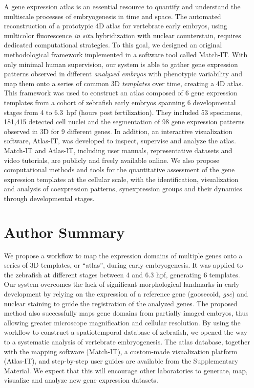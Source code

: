 A gene expression atlas is an essential resource to quantify and understand the multiscale processes of embryogenesis in time and space. The automated reconstruction of a prototypic 4D atlas for vertebrate early embryos, using multicolor fluorescence \emph{in situ} hybridization with nuclear counterstain, requires dedicated computational strategies. To this goal, we designed an original methodological framework implemented in a software tool called Match-IT. With only minimal human supervision, our system is able to gather gene expression patterns observed in different \emph{analyzed embryos} with phenotypic variability and map them onto a series of common 3D \emph{templates} over time, creating a 4D atlas. This framework was used to construct an atlas composed of 6 gene expression templates from a cohort of zebrafish early embryos spanning 6 developmental stages from 4 to 6.3~hpf (hours post fertilization). They included 53 specimens, 181,415 detected cell nuclei and the segmentation of 98 gene expression patterns observed in 3D for 9 different genes. In addition, an interactive visualization software, Atlas-IT, was developed to inspect, supervise and analyze the atlas. Match-IT and Atlas-IT, including user manuals, representative datasets and video tutorials, are publicly and freely available online.
We also propose computational methods and tools for the quantitative assessment of the gene expression templates at the cellular scale, with the identification, visualization and analysis of coexpression patterns, synexpression groups and their dynamics through developmental stages.

\section*{Author Summary}

We propose a workflow to map the expression domains of multiple genes onto a series of 3D templates, or ``atlas'', during early embryogenesis. It was applied to the zebrafish at different stages between 4 and 6.3 hpf, generating 6 templates. Our system overcomes the lack of significant morphological landmarks in early development by relying on the expression of a reference gene (goosecoid, \emph{gsc}) and nuclear staining to guide the registration of the analyzed genes. The proposed method also successfully maps gene domains from partially imaged embryos, thus allowing greater microscope magnification and cellular resolution. By using the workflow to construct a spatiotemporal database of zebrafish, we opened the way to a systematic analysis of vertebrate embryogenesis. The atlas database, together with the mapping software (Match-IT), a custom-made visualization platform (Atlas-IT), and step-by-step user guides are available from the Supplementary Material. We expect that this will encourage other laboratories to generate, map, visualize and analyze new gene expression datasets.

